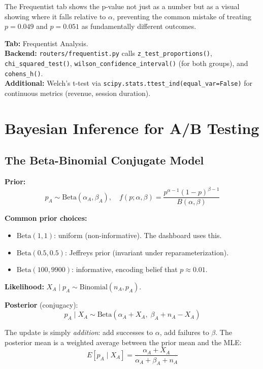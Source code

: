 \documentclass[11pt,a4paper]{article}
\newcommand{\code}[1]{\texttt{#1}}
\newcommand{\scipy}[1]{\texttt{scipy.stats.#1}}
\begin{document}
\vspace{8pt}

\begin{application}
The Frequentist tab shows the p-value not just as a number but as a visual showing where it falls relative to $\alpha$, preventing the common mistake of treating $p = 0.049$ and $p = 0.051$ as fundamentally different outcomes.
\end{application}

\vspace{8pt}

\begin{dashlink}
\textbf{Tab:} Frequentist Analysis.\\
\textbf{Backend:} \code{routers/frequentist.py} calls \code{z\_test\_proportions()}, \code{chi\_squared\_test()}, \code{wilson\_confidence\_interval()} (for both groups), and \code{cohens\_h()}.\\
\textbf{Additional:} Welch's t-test via \scipy{ttest\_ind(equal\_var=False)} for continuous metrics (revenue, session duration).
\end{dashlink}


\section{Bayesian Inference for A/B Testing}

\subsection{The Beta-Binomial Conjugate Model}

\begin{formaldef}
\textbf{Prior:}
\[
p_A \sim \mathrm{Beta}(\alpha_A, \beta_A), \quad f(p; \alpha, \beta) = \frac{p^{\alpha-1}(1-p)^{\beta-1}}{B(\alpha, \beta)}
\]

\textbf{Common prior choices:}
\begin{itemize}[nosep]
  \item $\mathrm{Beta}(1, 1)$: uniform (non-informative). The dashboard uses this.
  \item $\mathrm{Beta}(0.5, 0.5)$: Jeffreys prior (invariant under reparameterization).
  \item $\mathrm{Beta}(100, 9900)$: informative, encoding belief that $p \approx 0.01$.
\end{itemize}

\textbf{Likelihood:} $X_A \mid p_A \sim \mathrm{Binomial}(n_A, p_A)$.

\textbf{Posterior} (conjugacy):
\[
p_A \mid X_A \sim \mathrm{Beta}(\alpha_A + X_A, \;\beta_A + n_A - X_A)
\]

The update is simply \emph{addition}: add successes to $\alpha$, add failures to $\beta$. The posterior mean is a weighted average between the prior mean and the MLE:
\[
E[p_A \mid X_A] = \frac{\alpha_A + X_A}{\alpha_A + \beta_A + n_A}
\]
\end{formaldef}
\end{document}
